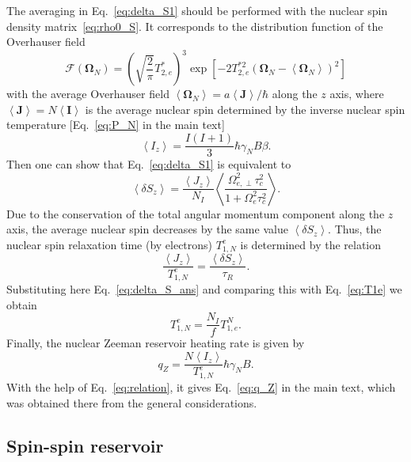 \documentclass[prl,nobibnotes,twocolumn,aps,longbibliography,superscriptaddress,notoc]{revtex4-1}
\newcommand{\braket}[1]{\left\langle #1 \right\rangle}
\begin{document}
The averaging in Eq.~\eqref{eq:delta_S1} should be performed with the nuclear spin density matrix~\eqref{eq:rho0_S}. It corresponds to the distribution function of the Overhauser field
\begin{equation}
  \mathcal F(\bm\Omega_N)=\left(\sqrt{\frac{2}{\pi}}T_{2,e}^*\right)^3\exp\left[-2T_{2,e}^{*2}\left(\bm\Omega_N-\braket{\bm\Omega_N}\right)^2\right]
\end{equation}
with the average Overhauser field $\braket{\bm\Omega_N}=a\braket{\bm J}/\hbar$ along the $z$ axis, where $\braket{\bm J}=N\braket{\bm I}$ is the average nuclear spin determined by the inverse nuclear spin temperature [Eq.~\eqref{eq:P_N} in the main text]
\begin{equation}
  \braket{I_z}=\frac{I(I+1)}{3}\hbar\gamma_NB\beta.
\end{equation}
Then one can show that Eq.~\eqref{eq:delta_S1} is equivalent to
\begin{equation}
  \label{eq:delta_S_ans}
  \braket{\delta S_z}=\frac{\braket{J_z}}{N_I}\braket{\frac{\Omega_{e,\perp}^2\tau_c^2}{1+\Omega_e^2\tau_c^2}}.
\end{equation}
Due to the conservation of the total angular momentum component along the $z$ axis, the average nuclear spin decreases by the same value $\braket{\delta S_z}$. Thus, the nuclear spin relaxation time (by electrons) $T_{1,N}^e$ is determined by the relation
\begin{equation}
  \frac{\braket{J_z}}{T_{1,N}^e}=\frac{\braket{\delta S_z}}{\tau_R}.
\end{equation}
Substituting here Eq.~\eqref{eq:delta_S_ans} and comparing this with Eq.~\eqref{eq:T1e} we obtain
\begin{equation}
  \label{eq:relation}
  T_{1,N}^e=\frac{N_I}{f}T_{1,e}^N.
\end{equation}
Finally, the nuclear Zeeman reservoir heating rate is given by
\begin{equation}
  q_Z=\frac{N\braket{I_z}}{T_{1,N}^e}\hbar\gamma_N B.
\end{equation}
With the help of Eq.~\eqref{eq:relation}, it gives Eq.~\eqref{eq:q_Z} in the main text, which was obtained there from the general considerations.

\subsection{Spin-spin reservoir}
\end{document}
